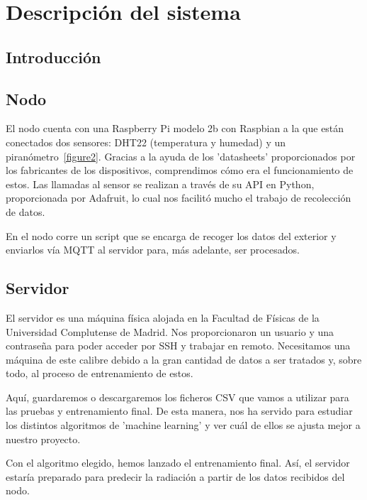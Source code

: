 \cleardoublepage

\chapter{Descripción del sistema}
\label{makereference2}

\section{Introducción}
\label{makereference2.1} 

\section{Nodo}
\label{makereference2.2}

El nodo cuenta con una Raspberry Pi modelo 2b con Raspbian a la que están conectados dos sensores: DHT22 (temperatura y humedad) y un piranómetro~\ref{figure2}.
Gracias a la ayuda de los 'datasheets' proporcionados por los fabricantes de los dispositivos, comprendimos cómo era el funcionamiento de estos. 
Las llamadas al sensor se realizan a través de su API en Python, proporcionada por Adafruit, lo cual nos facilitó mucho el trabajo de recolección de datos.

En el nodo corre un script que se encarga de recoger los datos del exterior y enviarlos vía MQTT al servidor para, más adelante, ser procesados.

\section{Servidor}
\label{makereference2.3}

El servidor es una máquina física alojada en la Facultad de Físicas de la Universidad Complutense de Madrid. Nos proporcionaron un usuario y una contraseña para poder acceder por SSH y trabajar en remoto. Necesitamos una máquina de este calibre debido a la gran cantidad de datos a ser tratados y, sobre todo, al proceso de entrenamiento de estos.

Aquí, guardaremos o descargaremos los ficheros CSV que vamos a utilizar para las pruebas y entrenamiento final. De esta manera, nos ha servido para estudiar los distintos algoritmos de 'machine learning' y ver cuál de ellos se ajusta mejor a nuestro proyecto.

Con el algoritmo elegido, hemos lanzado el entrenamiento final. Así, el servidor estaría preparado para predecir la radiación a partir de los datos recibidos del nodo.

